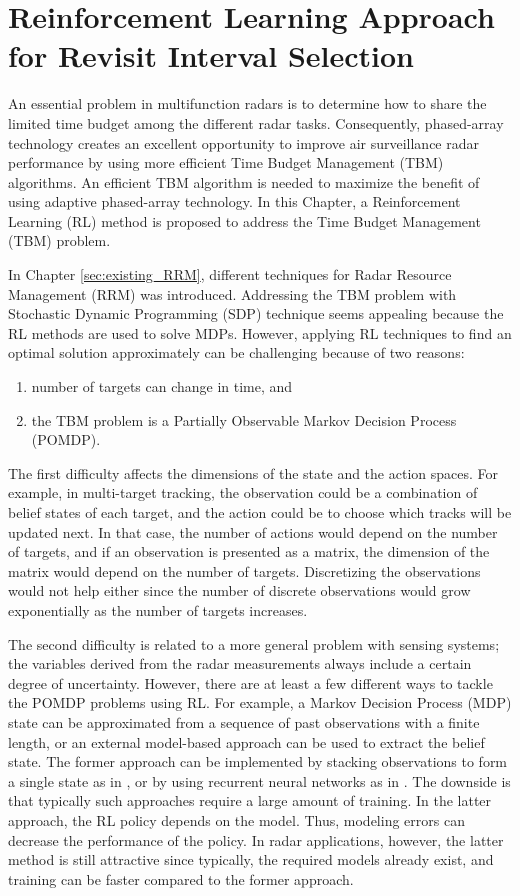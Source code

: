 \documentclass[english, 12pt, a4paper, elec, utf8, a-1b, online]{aaltothesis}
\begin{document}
\newpage
\section{Reinforcement Learning Approach for Revisit Interval Selection}\label{sec:rl_ri}

An essential problem in multifunction radars is to determine how to share the limited time budget among the different radar tasks. 
Consequently, phased-array technology creates an excellent opportunity to improve air surveillance radar performance by using more efficient Time Budget Management (TBM) algorithms. 
An efficient TBM algorithm is needed to maximize the benefit of using adaptive phased-array technology. 
In this Chapter, a Reinforcement Learning (RL) method is proposed to address the Time Budget Management (TBM) problem.

In Chapter \ref{sec:existing_RRM}, different techniques for Radar Resource Management (RRM) was introduced.
Addressing the TBM problem with Stochastic Dynamic Programming (SDP) technique seems appealing because the RL methods are used to solve MDPs.
However, applying RL techniques to find an optimal solution approximately can be challenging because of two reasons:
\begin{enumerate}
    \item number of targets can change in time, and
    \item the TBM problem is a Partially Observable Markov Decision Process (POMDP).
\end{enumerate}
The first difficulty affects the dimensions of the state and the action spaces. 
For example, in multi-target tracking, the observation could be a combination of belief states of each target, and the action could be to choose which tracks will be updated next.
In that case, the number of actions would depend on the number of targets, and if an observation is presented as a matrix, the dimension of the matrix would depend on the number of targets.
Discretizing the observations would not help either since the number of discrete observations would grow exponentially as the number of targets increases.

The second difficulty is related to a more general problem with sensing systems; the variables derived from the radar measurements always include a certain degree of uncertainty.
However, there are at least a few different ways to tackle the POMDP problems using RL.
For example, a Markov Decision Process (MDP) state can be approximated from a sequence of past observations with a finite length, or an external model-based approach can be used to extract the belief state.
The former approach can be implemented by stacking observations to form a single state as in \cite{Mnih2013}, or by using recurrent neural networks as in \cite{Hausknecht2015}.
The downside is that typically such approaches require a large amount of training.
In the latter approach, the RL policy depends on the model.
Thus, modeling errors can decrease the performance of the policy.
In radar applications, however, the latter method is still attractive since typically, the required models already exist, and training can be faster compared to the former approach.
\end{document}
